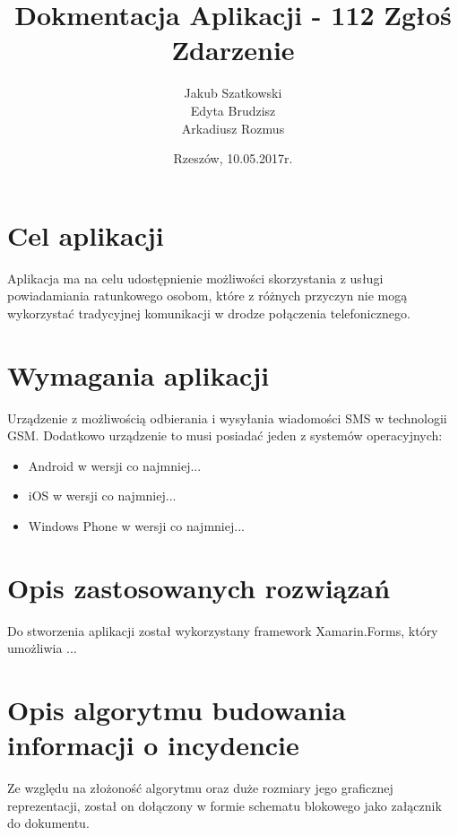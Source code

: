 \documentclass[a4paper]{article}
\title{Dokmentacja Aplikacji - 112 Zgłoś Zdarzenie}
\author{Jakub Szatkowski\\Edyta Brudzisz\\Arkadiusz Rozmus}
\date{Rzeszów, 10.05.2017r.}
\begin{document}
	\maketitle
	
	\section{Cel aplikacji}
	Aplikacja ma na celu udostępnienie możliwości skorzystania z usługi powiadamiania ratunkowego osobom, które z różnych przyczyn nie mogą wykorzystać tradycyjnej komunikacji w drodze połączenia telefonicznego.
	
	\section{Wymagania aplikacji}
	Urządzenie z możliwością odbierania i wysyłania wiadomości SMS w technologii GSM. Dodatkowo urządzenie to musi posiadać jeden z systemów operacyjnych:
	\begin{itemize}
		\item Android w wersji co najmniej...
		\item iOS w wersji co najmniej...
		\item Windows Phone w wersji co najmniej...
	\end{itemize}
	
	\section{Opis zastosowanych rozwiązań}
	Do stworzenia aplikacji został wykorzystany framework Xamarin.Forms, który umożliwia ...
	
	\section{Opis algorytmu budowania informacji o incydencie}
	Ze względu na złożoność algorytmu oraz duże rozmiary jego graficznej reprezentacji, został on dołączony w formie schematu blokowego jako załącznik do dokumentu.
	
\end{document}
